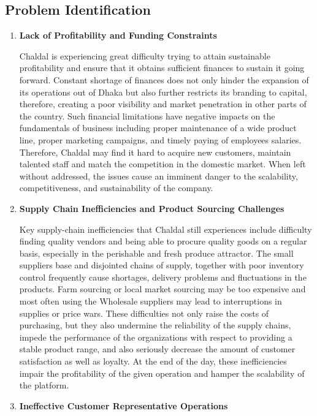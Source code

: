 \documentclass[12pt,a4paper]{article}
\begin{document}
\subsection{Problem Identification}

\begin{enumerate}
    \item \textbf{Lack of Profitability and Funding Constraints}

    Chaldal is experiencing great difficulty trying to attain sustainable profitability and ensure that it obtains sufficient finances to sustain it going forward. Constant shortage of finances does not only hinder the expansion of its operations out of Dhaka but also further restricts its branding to capital, therefore, creating a poor visibility and market penetration in other parts of the country. Such financial limitations have negative impacts on the fundamentals of business including proper maintenance of a wide product line, proper marketing campaigns, and timely paying of employees salaries. Therefore, Chaldal may find it hard to acquire new customers, maintain talented staff and match the competition in the domestic market. When left without addressed, the issues cause an imminent danger to the scalability, competitiveness, and sustainability of the company.
   
    \item \textbf{Supply Chain Inefficiencies and Product Sourcing Challenges}

    Key supply-chain inefficiencies that Chaldal still experiences include difficulty finding quality vendors and being able to procure quality goods on a regular basis, especially in the perishable and fresh produce attractor. The small suppliers base and disjointed chains of supply, together with poor inventory control frequently cause shortages, delivery problems and fluctuations in the products. Farm sourcing or local market sourcing may be too expensive and most often using the Wholesale suppliers may lead to interruptions in supplies or price wars. These difficulties not only raise the costs of purchasing, but they also undermine the reliability of the supply chains, impede the performance of the organizations with respect to providing a stable product range, and also seriously decrease the amount of customer satisfaction as well as loyalty. At the end of the day, these inefficiencies impair the profitability of the given operation and hamper the scalability of the platform.

    
    \item \textbf{Ineffective Customer Representative Operations}


\end{enumerate}
\end{document}
